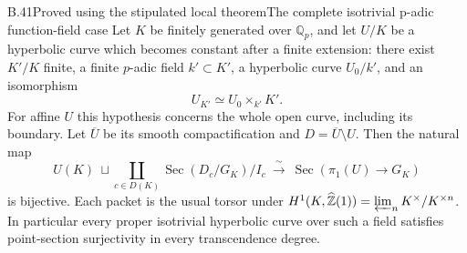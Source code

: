 \begin{statement}{B.41}{Proved using the stipulated local theorem}{The complete isotrivial p-adic function-field case}
Let $K$ be finitely generated over $\mathbb Q_p$,
and let $U/K$ be a hyperbolic curve which becomes
constant after a finite extension: there exist
$K'/K$ finite, a finite $p$-adic field $k'\subset K'$,
a hyperbolic curve $U_0/k'$, and an isomorphism
\[
 U_{K'}\simeq U_0\times_{k'}K'.
 \tag{B.41.1}
\]
For affine $U$ this hypothesis concerns the whole
open curve, including its boundary. Let
$\overline U$ be its smooth compactification and
$D=\overline U\setminus U$. Then the natural map
\[
 U(K)\ \sqcup\!\coprod_{c\in D(K)}
       \operatorname{Sec}(D_c/G_K)/I_c
       \ \xrightarrow{\ \sim\ }\
       \operatorname{Sec}(\pi_1(U)\to G_K)
 \tag{B.41.2}
\]
is bijective. Each packet is the usual torsor under
$H^1(K,\widehat{\mathbb Z}(1))=
\varprojlim_n K^\times/K^{\times n}$.
In particular every proper isotrivial hyperbolic
curve over such a field satisfies point-section
surjectivity in every transcendence degree.
\end{statement}
